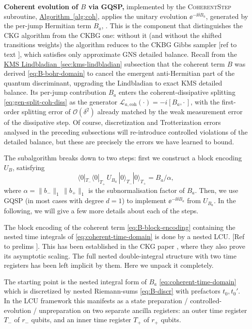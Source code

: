 \medskip
\noindent \textbf{Coherent evolution of $B$ via GQSP,} implemented by the \textsc{CoherentStep} subroutine, \hyperref[alg:coh]{Algorithm~\ref*{alg:coh}}, applies the unitary evolution $\ee^{-\ii \delta B_a}$, generated by the per-jump Hermitian term $B_a$, . This is the component that distinguishes the CKG algorithm from the CKBG one: without it (and without the shifted transitions weights) the algorithm reduces to the CKBG Gibbs sampler [ref to text ], which satisfies only approximate GNS detailed balance. Recall from the \hyperref[sec:kms-lindbladian]{KMS Lindbladian~\ref*{sec:kms-lindbladian}} subsection that the coherent term $B$ was derived \eqref{eq:B-bohr-domain} to cancel the emergent anti-Hermitian part of the quantum discriminant, upgrading the Lindbladian to exact KMS detailed balance. Its per-jump contribution $B_a$ enters the coherent-dissipative splitting \eqref{eq:gen-split-coh-diss} as the generator $\mathcal{L}_{a,\mathrm{coh}}(\cdot) = -i[B_a, \cdot\,]$, with the first-order splitting error of $\mathcal{O}(\delta^2)$ already matched by the weak measurement error of the dissipative step. Of course, discretization and Trotterization errors analysed in the preceding subsections will re-introduce controlled violations of the detailed balance, but these are precisely the errors we have learned to bound.

The subalgorithm breaks down to two steps: first we construct a block encoding $U_B$, satisfying
\begin{equation} \label{eq:B-block-encoding}
    \langle 0|_{T_-}\langle 0|_{T_+}\,U_{B_a}\,|0\rangle_{T_-}|0\rangle_{T_+} = B_a/\alpha,
\end{equation}
where $\alpha = \|b_-\|_1\,\|b_+\|_1$ is the subnormalisation factor of $B_a$. Then, we use GQSP \cite{motlagh2024generalized} (in most cases with degree $d = 1$) to implement $\ee^{-\ii \delta B_a}$ from $U_{B_a}$. In the following, we will give a few more details about each of the steps.

The block encoding of the coherent term \eqref{eq:B-block-encoding} containing the nested time integrals of \eqref{eq:coherent-time-domain} is done by a nested LCU. [Ref to prelims ]. This has been established in the CKG paper \cite[Proposition III.1]{chen2023efficient}, where they also prove its asymptotic scaling. The full nested double-integral structure with two time registers has been left implicit by them. Here we unpack it completely.

The starting point is the nested integral form of $B_a$ \eqref{eq:coherent-time-domain} which is discretized by nested Riemann-sums \eqref{eq:B-discr} with prefactors $t_0, t_0'$. In the LCU framework \cite{childs2012hamiltonian,berry2015simulating} this manifests as a state preparation / controlled-evolution / unpreparation on two separate ancilla registers: an outer time register $T_-$ of $r_-$ qubits, and an inner time register $T_+$ of $r_+$ qubits. 

